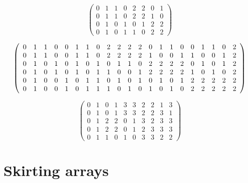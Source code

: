 \documentclass[12pt,reqno]{article}
\begin{document}
\[
 \begin{pmatrix}
  0 & 1 & 1 & 0 & 2 & 2 & 0 & 1 \\
  0 & 1 & 1 & 0 & 2 & 2 & 1 & 0 \\
  0 & 1 & 0 & 1 & 0 & 1 & 2 & 2 \\
  0 & 1 & 0 & 1 & 1 & 0 & 2 & 2
 \end{pmatrix}
\]


\[
 \left( \begin{array}{c c c c c c c c c c c c c c ccccccc}
  0 & 1 & 1 & 0 & 0 & 1 & 1 & 0 & 2 & 2 & 2 & 2 & 0 & 1 & 1 & 0 & 0 & 1 & 1 & 0 & 2 \\
  0 & 1 & 1 & 0 & 0 & 1 & 1 & 0 & 2 & 2 & 2 & 2 & 1 & 0 & 0 & 1 & 1 & 0 & 0 & 1 & 2 \\
  0 & 1 & 0 & 1 & 0 & 1 & 0 & 1 & 0 & 1 & 1 & 0 & 2 & 2 & 2 & 2 & 0 & 1 & 0 & 1 & 2 \\
  0 & 1 & 0 & 1 & 0 & 1 & 0 & 1 & 1 & 0 & 0 & 1 & 2 & 2 & 2 & 2 & 1 & 0 & 1 & 0 & 2 \\
  0 & 1 & 0 & 0 & 1 & 0 & 1 & 1 & 0 & 1 & 0 & 1 & 0 & 1 & 0 & 1 & 2 & 2 & 2 & 2 & 2 \\
  0 & 1 & 0 & 0 & 1 & 0 & 1 & 1 & 1 & 0 & 1 & 0 & 1 & 0 & 1 & 0 & 2 & 2 & 2 & 2 & 2 
 \end{array} \right)
\]

\[
\begin{pmatrix}
    0 & 1 & 0 & 1 & 3 & 3 & 2 & 2 & 1 & 3 \\
    0 & 1 & 0 & 1 & 3 & 3 & 2 & 2 & 3 & 1 \\
    0 & 1 & 2 & 2 & 0 & 1 & 3 & 2 & 3 & 3 \\
    0 & 1 & 2 & 2 & 0 & 1 & 2 & 3 & 3 & 3 \\
    0 & 1 & 1 & 0 & 1 & 0 & 3 & 3 & 2 & 2 
\end{pmatrix}
\]

\section{Skirting arrays}
\end{document}
